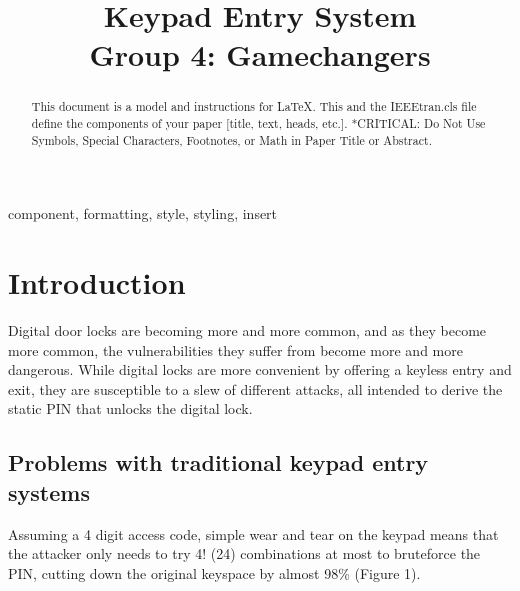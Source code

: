 \documentclass[conference]{IEEEtran}
\begin{document}
\title{Keypad Entry System\\
Group 4: Gamechangers
}

\author{
\and
{}
\and
{}
\and
{}
}

\maketitle

\begin{abstract}
This document is a model and instructions for \LaTeX.
This and the IEEEtran.cls file define the components of your paper [title, text, heads, etc.]. *CRITICAL: Do Not Use Symbols, Special Characters, Footnotes, 
or Math in Paper Title or Abstract.
\end{abstract}

\begin{IEEEkeywords}
component, formatting, style, styling, insert
\end{IEEEkeywords}

\section{Introduction}
Digital door locks are becoming more and more common, and as they become more common, the vulnerabilities they suffer from become more and more dangerous. While digital locks are more convenient by offering a keyless entry and exit, they are susceptible to a slew of different attacks, all intended to derive the static PIN that unlocks the digital lock.

\subsection{Problems with traditional keypad entry systems}

Assuming a 4 digit access code, simple wear and tear on the keypad means that the attacker only needs to try 4! (24) combinations at most to bruteforce the PIN, cutting down the original keyspace by almost 98\% (Figure 1).
\end{document}
